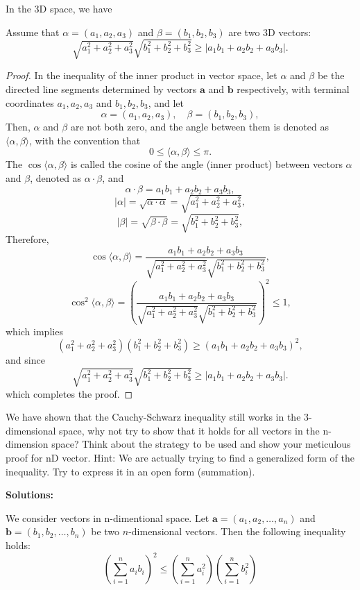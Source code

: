 \documentclass[
	12pt, %
	fleqn, %
	a4paper, %
]{LegrandOrangeBook}
\begin{document}
In the 3D space, we have
\begin{corollary}
    Assume that $\alpha = (a_1, a_2, a_3)$ and $\beta = (b_1, b_2, b_3)$ are two 3D vectors:
    \[
\sqrt{a_1^2 + a_2^2 + a_3^2}\sqrt{b_1^2 + b_2^2 + b_3^2} \geq |a_1b_1 + a_2b_2 + a_3b_3|.
\] 
\end{corollary}
\begin{proof}
    In the inequality of the inner product in vector space, let \( \alpha \) and \( \beta \) be the directed line segments determined by vectors \(\mathbf{a}\) and \(\mathbf{b}\) respectively, with terminal coordinates \( a_1, a_2, a_3 \) and \( b_1, b_2, b_3 \), and let
\[
\alpha = (a_1, a_2, a_3), \quad \beta = (b_1, b_2, b_3),
\]
Then, \( \alpha \) and \( \beta \) are not both zero, and the angle between them is denoted as \( \langle \alpha, \beta \rangle \), with the convention that
\[
0 \leq \langle \alpha, \beta \rangle \leq \pi.
\]
The \( \cos\langle \alpha, \beta \rangle \) is called the cosine of the angle (inner product) between vectors \( \alpha \) and \( \beta \), denoted as \( \alpha \cdot \beta \), and
\[
\alpha \cdot \beta = a_1b_1 + a_2b_2 + a_3b_3,
\]
\[
|\alpha| = \sqrt{\alpha \cdot \alpha} = \sqrt{a_1^2 + a_2^2 + a_3^2},
\]
\[
|\beta| = \sqrt{\beta \cdot \beta} = \sqrt{b_1^2 + b_2^2 + b_3^2},
\]
Therefore,
\[
\cos\langle \alpha, \beta \rangle = \frac{a_1b_1 + a_2b_2 + a_3b_3}{\sqrt{a_1^2 + a_2^2 + a_3^2}\sqrt{b_1^2 + b_2^2 + b_3^2}},
\]
\[
\cos^2\langle \alpha, \beta \rangle = \left(\frac{a_1b_1 + a_2b_2 + a_3b_3}{\sqrt{a_1^2 + a_2^2 + a_3^2}\sqrt{b_1^2 + b_2^2 + b_3^2}}\right)^2 \leq 1,
\]
which implies
\[
(a_1^2 + a_2^2 + a_3^2)(b_1^2 + b_2^2 + b_3^2) \geq (a_1b_1 + a_2b_2 + a_3b_3)^2,
\]
and since
\[
\sqrt{a_1^2 + a_2^2 + a_3^2}\sqrt{b_1^2 + b_2^2 + b_3^2} \geq |a_1b_1 + a_2b_2 + a_3b_3|.
\]
which completes the proof.
\end{proof}
\begin{exercise}
    We have shown that the Cauchy-Schwarz inequality still works in the 3-dimensional space, why not try
    to show that it holds for all vectors in the n-dimension space? Think about the strategy to be used and show your 
    meticulous proof for nD vector. Hint: We are actually trying to find a generalized form of the inequality.
    Try to express it in an open form (summation).
\end{exercise}
\textbf{Solutions:}
\begin{theorem}\label{gcsineq}
    We consider vectors in n-dimentional space.
    Let \( \mathbf{a} = (a_1, a_2, \ldots, a_n) \) and \( \mathbf{b} = (b_1, b_2, \ldots, b_n) \) be two \( n \)-dimensional vectors. Then the following inequality holds:
\[
\left(\sum_{i=1}^{n} a_i b_i\right)^2 \leq \left(\sum_{i=1}^{n} a_i^2\right) \left(\sum_{i=1}^{n} b_i^2\right)
\]
\end{theorem}
\end{document}

